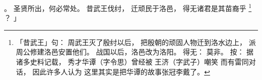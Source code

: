     。
    圣贤所出，何必常处。
    昔武王伐纣，
    迁顽民于洛邑，
    得无诸君是其苗裔乎%
    \footnote{%
        「昔武王」句：
            周武王灭了殷纣以后，
            把殷朝的顽固人物迁到洛水边上，
            派周公修建洛邑安置他们。
            战国以后，洛邑改为洛阳。
        得无：
            莫非。
        按：
            据诸多史料记载，
            秀才华谭（字令思）曾经被
            王济（字武子）嘲笑
            而有雷同对话，
            因此许多人认为
            这里其实是把华谭的故事张冠李戴了。
    }%
    ？
」

\switchcolumn


